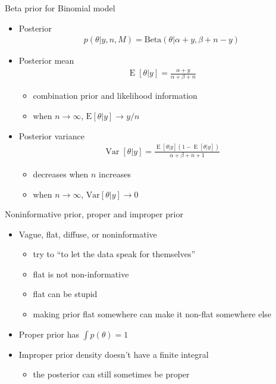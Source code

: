 \documentclass[english,t]{beamer}
\DeclareMathOperator{\E}{E}
\DeclareMathOperator{\Var}{Var}
\begin{document}
\begin{frame}{Beta prior for Binomial model}

  \begin{itemize}
  \item Posterior
    \baselineskip
    \begin{align*}
      p(\theta|y,n,M) = \text{Beta}(\theta|\alpha+y,\beta+n-y)
    \end{align*}
  \item Posterior mean
    \baselineskip
    \begin{align*}
      \E[\theta|y] = \frac{\alpha+y}{\alpha+\beta+n}
    \end{align*}
    \begin{itemize}
    \item combination prior and likelihood information
    \item when $n\rightarrow\infty$, $\text{E}[\theta|y]\rightarrow y/n$
    \end{itemize}
    \pause
  \item  Posterior variance
    \baselineskip
    \begin{align*}
      \Var[\theta|y]=\frac{\E[\theta|y](1-\E[\theta|y])}{\alpha+\beta+n+1}
    \end{align*}
    \begin{itemize}
    \item decreases when $n$ increases
    \item when $n\rightarrow\infty$, $\text{Var}[\theta|y]\rightarrow 0$
    \end{itemize}      
  \end{itemize}

\end{frame}

\begin{frame}
{Noninformative prior, proper and improper prior}

  \begin{itemize}
  \item Vague, flat, diffuse, or noninformative
    \begin{itemize}
    \item try to ``to let the data speak for themselves''
    \item flat is not non-informative
    \item flat can be stupid
    \item making prior flat somewhere can make it non-flat somewhere
      else
    \end{itemize}
  \item Proper prior has $\int p(\theta) = 1$
  \item Improper prior density doesn't have a finite integral
    \begin{itemize}
    \item the posterior can still sometimes be proper
    \end{itemize}
  \end{itemize}
  
\end{frame}
\end{document}
